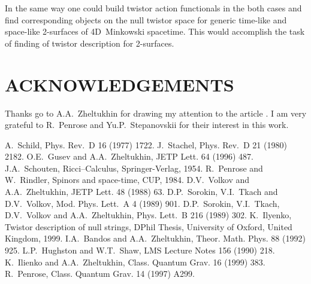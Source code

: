 \documentclass[a4paper,twocolumn,showkeys,showpacs,aps]{revtex4}
\begin{document}
In the same way one could build twistor action functionals in the
both cases and find corresponding objects on the null twistor
space for generic time-like and space-like 2-surfaces of
4D~Minkowski spacetime. This would accomplish the task of finding
of twistor description for 2-surfaces.

\section{ACKNOWLEDGEMENTS}

Thanks go to A.A.~Zheltukhin for drawing my attention to the
article \cite{Gusev-Zheltukhin}. I am very grateful to R.~Penrose
and Yu.P.~Stepanovskii for their interest in this work.

\begin{thebibliography}{99}
   A.~Schild, Phys. Rev.~D 16 (1977) 1722.
  J.~Stachel, Phys. Rev.~D 21 (1980) 2182.
 O.E.~Gusev and A.A.~Zheltukhin,
                   JETP Lett. 64 (1996) 487.
 J.A.~Schouten, Ricci--Calculus,
                   Springer-Ver\-lag, 1954.
      R.~Penrose and W.~Rindler, Spinors and
                   space-time, CUP, 1984.
                   D.V.~Volkov and A.A.~Zheltukhin, JETP Lett.
                   48 (1988) 63.
                   D.P.~Sorokin, V.I.~Tkach and D.V.~Volkov, Mod.
                   Phys. Lett.~A 4 (1989) 901.
                   D.P.~Sorokin, V.I.~Tkach, D.V.~Volkov and
                   A.A.~Zhel\-tu\-khin, Phys. Lett.~B 216 (1989) 302.
   K.~Ilyenko, Twistor description of
                   null strings, DPhil Thesis, University of Oxford,
                   United Kingdom, 1999.
 I.A.~Bandos and A.A.~Zheltukhin,
                   Theor. Math. Phys. 88 (1992) 925.
 L.P.~Hughston and W.T.~Shaw, LMS Lecture Notes 156
                   (1990) 218.
 K.~Ilienko and A.A.~Zheltukhin, Class. Quantum Grav.
                   16 (1999) 383.
 R.~Penrose, Class. Quantum Grav. 14 (1997) A299.
\end{thebibliography}
\end{document}
